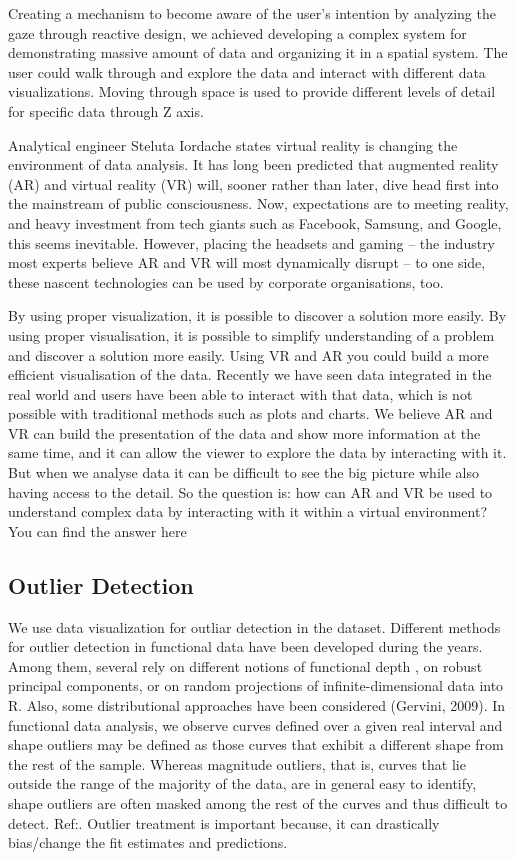 \documentclass[]{book}
\theoremstyle{definition}
\theoremstyle{definition}
\theoremstyle{definition}
\theoremstyle{remark}
\begin{document}
Creating a mechanism to become aware of the user's intention by
analyzing the gaze through reactive design, we achieved developing a
complex system for demonstrating massive amount of data and organizing
it in a spatial system. The user could walk through and explore the data
and interact with different data visualizations. Moving through space is
used to provide different levels of detail for specific data through Z
axis.

Analytical engineer Steluta Iordache states virtual reality is changing
the environment of data analysis. It has long been predicted that
augmented reality (AR) and virtual reality (VR) will, sooner rather than
later, dive head first into the mainstream of public consciousness. Now,
expectations are to meeting reality, and heavy investment from tech
giants such as Facebook, Samsung, and Google, this seems inevitable.
However, placing the headsets and gaming -- the industry most experts
believe AR and VR will most dynamically disrupt -- to one side, these
nascent technologies can be used by corporate organisations, too.

By using proper visualization, it is possible to discover a solution
more easily. By using proper visualisation, it is possible to simplify
understanding of a problem and discover a solution more easily. Using VR
and AR you could build a more efficient visualisation of the data.
Recently we have seen data integrated in the real world and users have
been able to interact with that data, which is not possible with
traditional methods such as plots and charts. We believe AR and VR can
build the presentation of the data and show more information at the same
time, and it can allow the viewer to explore the data by interacting
with it. But when we analyse data it can be difficult to see the big
picture while also having access to the detail. So the question is: how
can AR and VR be used to understand complex data by interacting with it
within a virtual environment? You can find the answer
here\citep{vr_education}

\subsection{Outlier Detection}\label{outlier-detection}

\citep{outliar}

We use data visualization for outliar detection in the dataset.
Different methods for outlier detection in functional data have been
developed during the years. Among them, several rely on different
notions of functional depth , on robust principal components, or on
random projections of infinite-dimensional data into R. Also, some
distributional approaches have been considered (Gervini, 2009). In
functional data analysis, we observe curves defined over a given real
interval and shape outliers may be defined as those curves that exhibit
a different shape from the rest of the sample. Whereas magnitude
outliers, that is, curves that lie outside the range of the majority of
the data, are in general easy to identify, shape outliers are often
masked among the rest of the curves and thus difficult to detect.
Ref:\citep{outliar}. Outlier treatment is important because, it can
drastically bias/change the fit estimates and predictions.
\end{document}
